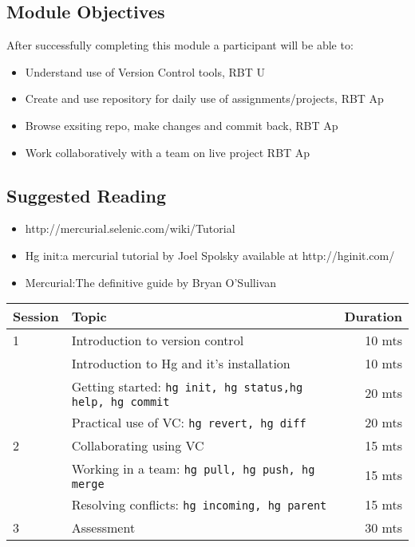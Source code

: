 \documentclass{article}
\begin{document}
\subsection{Module Objectives}
After successfully completing this module a participant will be able to:
        \begin{itemize}
            \item Understand use of Version Control tools, \hfill RBT U
            \item Create and use repository for daily use of assignments/projects, \hfill RBT Ap
            \item Browse exsiting repo, make changes and commit back, \hfill RBT Ap
            \item Work collaboratively with a team on live project \hfill RBT Ap
        \end{itemize}
\subsection{Suggested Reading}
\begin{itemize}
    \item http://mercurial.selenic.com/wiki/Tutorial
    \item Hg init:a mercurial tutorial by Joel Spolsky available at http://hginit.com/
    \item Mercurial:The definitive guide by Bryan O'Sullivan 
\end{itemize}

\begin{tabular}{llr}
\hline
Session & Topic & Duration\\\hline
1 & Introduction to version control                             & 10 mts\\
  & Introduction to Hg and it's installation                    & 10 mts\\
  & Getting started: \tt{hg init, hg status,hg help, hg commit} & 20 mts\\
  & Practical use of VC: \tt{hg revert, hg diff}                & 20 mts\\\hline

2 & Collaborating using VC                                      & 15 mts\\
  & Working in a team: \tt{hg pull, hg push, hg merge}          & 15 mts\\
  & Resolving conflicts: \tt{hg incoming, hg parent}            & 15 mts\\\hline

3 & Assessment                                                  & 30 mts\\\hline\hline
\end{tabular}
\end{document}
